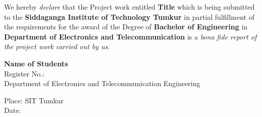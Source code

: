 \declaration

\vspace*{0.5in}

\noindent We hereby \textit{declare} that the Project work entitled \textbf{Title} which is being submitted to the \textbf{Siddaganga Institute of Technology Tumkur} in partial fulfillment of the requirements for the award of the Degree of \textbf{Bachelor of Engineering} in \textbf{Department of Electronics and Telecommunication} is a \textit{bona fide report of the project work carried out by us}. 


\begin{singlespacing}
\begin{flushright}
\vspace*{1cm}
\hfill {\bf Name of Students}\\
\hfill Register No.: \\
\hfill {Department of Electronics and Telecommunication Engineering}\\
\end{flushright}

\noindent Place: SIT Tumkur \\
\noindent Date: 
\end{singlespacing}